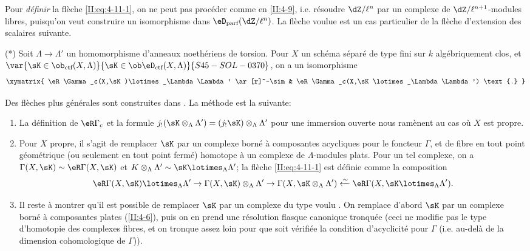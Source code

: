 Pour \emph{définir} la flèche \eqref{II:eq:4-11-1}, on ne peut pas 
procéder comme en \ref{II:4-9}, i.e. résoudre $\dZ/\ell^n$ par un complexe 
de $\dZ/\ell^{n+1}$-modules libres, puisqu'on veut construire un isomorphisme 
dans $\eD_\text{parf}(\dZ/\ell^n)$. La flèche voulue est un cas particulier de 
la flèche d'extension des scalaires suivante. 

(*) Soit $\Lambda\to\Lambda'$ un homomorphisme d'anneaux noethériens de 
torsion. Pour $X$ un schéma séparé de type fini sur $k$ algébriquement 
clos, et $\var{\sK\in\ob_{\text{ctf}}(X,\Lambda)}{\sK\in\ob\eD_\text{ctf}(X,\Lambda)}{S45-SOL-0370}$, on a un isomorphisme 
\[\xymatrix{
  \eR\Gamma_c(X,\sK)\lotimes_\Lambda \Lambda' \ar[r]^-\sim & \eR \Gamma_c(X,\sK\lotimes_\Lambda \Lambda') \text{.}
}\]

Des flèches plus générales sont construites dans \cite[XVII 4.2.12]{sga4}. La 
m\'
ethode est la suivante: 
\begin{enumerate}[\indent a)]
  \item {}La définition de $\eR\Gamma_c$ et la formule 
    $j_!(\sK\otimes_\Lambda\Lambda') = (j_! \sK)\otimes_\Lambda\Lambda'$ pour une 
    immersion ouverte nous ramènent au cas où $X$ est propre. 
  \item Pour $X$ propre, il s'agit de remplacer $\sK$ par un complexe borné à 
    composantes acycliques pour le foncteur $\Gamma$, et de fibre en tout point 
    géométrique (ou seulement en tout point fermé) homotope à un 
    complexe de $\Lambda$-modules plats. Pour un tel complexe, on a 
    $\Gamma(X,\sK)\sim \eR\Gamma(X,\sK)$ et 
    $K\otimes_\Lambda\Lambda'\sim \sK\lotimes_\Lambda\Lambda'$; la flèche 
    \eqref{II:eq:4-11-1} est définie comme la composition 
    \[
      \eR\Gamma(X,\sK)\lotimes_\Lambda \Lambda' \to \Gamma(X,\sK)\otimes_\Lambda\Lambda' \to \Gamma(X,\sK\otimes_\Lambda\Lambda') \xleftarrow\sim \eR\Gamma(X,\sK\lotimes_\Lambda\Lambda') \text{.}
    \]
  \item Il reste à montrer qu'il est possible de remplacer $\sK$ par un 
    complexe du type voulu \cite[XVII.4.2.10]{sga4}. On remplace d'abord $\sK$ par 
    un complexe borné à composantes plates (\ref{II:4-6}), puis on en prend 
    une résolution flasque canonique tronquée (ceci ne modifie pas le type 
    d'homotopie des complexes fibres, et on tronque assez loin pour que 
    soit vérifiée la condition d'acyclicité pour $\Gamma$ (i.e. au-delà 
    de la dimension cohomologique de $\Gamma$)). 
\end{enumerate}





